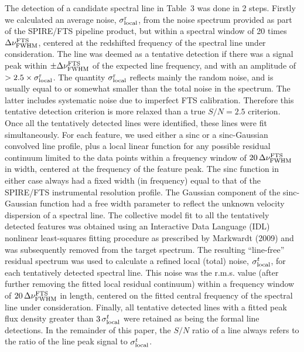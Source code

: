 \documentclass[preprint]{aastex}
\begin{document}
The detection of a candidate spectral line in Table~3 was done in 2 steps. Firstly
we calculated an average noise, $\sigma^{\rm r}_{\rm local}$, from the noise spectrum
provided as part of the SPIRE/FTS pipeline product, but within a spectral window of
20 times $\Delta\nu^{\rm FTS}_{\rm FWHM}$, centered at the redshifted 
frequency of the spectral line under consideration.
The line was deemed as a tentative detection if there was a signal peak within
$\pm\Delta\nu^{\rm FTS}_{\rm FWHM}$ of the expected line frequency, and with an
amplitude of $> 2.5\times
\sigma^{\rm r}_{\rm local}$.   The quantity $\sigma^{\rm r}_{\rm local}$ reflects 
mainly the random noise, and is usually equal to or somewhat smaller than the total
noise in the spectrum.  The latter includes systematic noise due to imperfect 
FTS calibration.  Therefore this tentative detection criterion is more 
relaxed than a true $S/N = 2.5$ criterion.   Once all the tentatively detected lines
were identified, these lines were fit simultaneously.  For each feature, 
we used either a sinc or a sinc-Gaussian convolved line profile,  plus a local linear 
function for any possible residual continuum limited to the data points within a frequency
window of $20\,\Delta\nu^{\rm FTS}_{\rm FWHM}$ in width, centered at the frequency 
of the feature peak.   The sinc function in either 
case always had a fixed width (in frequency) equal to that of the SPIRE/FTS instrumental
resolution profile.  The Gaussian component of the sinc-Gaussian function had a free 
width parameter to reflect the unknown velocity dispersion of a spectral line.  
The collective model fit to all the tentatively detected features was obtained using 
an Interactive Data Language (IDL) nonlinear least-squares fitting procedure as 
prescribed by Markwardt (2009) and was subsequently removed from the target spectrum.  
The resulting ``line-free'' residual 
spectrum was used to calculate a refined local (total) noise, $\sigma^t_{\rm local}$, 
for each tentatively detected spectral line.   This noise was the r.m.s. value (after
further removing the fitted local residual continuum) within a frequency window of 
$20\,\Delta\nu^{\rm FTS}_{\rm FWHM}$ in length, centered on the fitted central 
frequency of the spectral line under consideration.  
Finally, all tentative detected lines with a fitted peak flux density greater
than $3\,\sigma^t_{\rm local}$ were retained as being the formal line detections. 
In the remainder of this paper, the $S/N$ ratio of a line always refers to the ratio
of the line peak signal to $\sigma^t_{\rm local}$.
\end{document}
